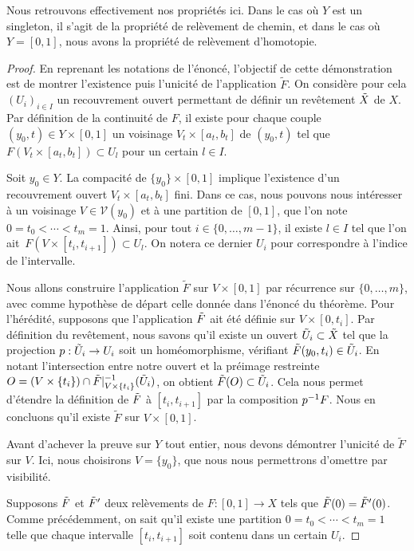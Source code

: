 Nous retrouvons effectivement nos propriétés ici. Dans le cas où $Y$ est un singleton, il s'agit de la propriété de relèvement de chemin, et dans le cas où $Y=[0,1]$, nous avons la propriété de relèvement d'homotopie.

\begin{proof}
En reprenant les notations de l'énoncé, l'objectif de cette démonstration est de montrer l'existence puis l'unicité de l'application $\tilde{F}$. On considère pour cela $(U_i)_{i\in I}$ un recouvrement ouvert permettant de définir un revêtement $\Tilde{X}$ de $X$. Par définition de la continuité de $F$, il existe pour chaque couple~$(y_0,t)\in Y\times[0,1]$ un voisinage $V_t\times[a_t,b_t]$ de $(y_0,t)$ tel que $F(V_t\times[a_t,b_t])\subset U_l$ pour un certain $l\in I$.

Soit $y_0\in Y$. La compacité de $\{y_0\}\times[0,1]$ implique l'existence d'un recouvrement ouvert $V_t\times[a_t,b_t]$ fini. Dans ce cas, nous pouvons nous intéresser à un voisinage $V\in\mathcal{V}(y_0)$ et à une partition de $[0,1]$, que l'on note~$0=t_0<\cdots<t_m=1$. Ainsi, pour tout $i\in\{0,\ldots,m-1\}$, il existe $l\in I$ tel que l'on ait~$F(V\times[t_i,t_{i+1}])\subset U_l$. On notera ce dernier $U_i$ pour correspondre à l'indice de l'intervalle.

\bigskip Nous allons construire l'application $\tilde{F}$ sur $V\times[0,1]$ par récurrence sur $\{0,\ldots,m\}$, avec comme hypothèse de départ celle donnée dans l'énoncé du théorème. Pour l'hérédité, supposons que l'application $\Tilde{F}$ ait été définie sur $V\times[0,t_i]$. Par définition du revêtement, nous savons qu'il existe un ouvert $\Tilde{U}_i\subset\tilde{X}$ tel que la projection $p:\Tilde{U}_i\to U_i$ soit un homéomorphisme, vérifiant $\Tilde{F}(y_0,t_i)\in\Tilde{U}_i$. En notant l'intersection entre notre ouvert et la préimage restreinte $O=(V\times\{t_i\})\cap\Tilde{F}|_{V\times\{t_i\}}^{-1}(\Tilde{U}_i)$, on obtient $\Tilde{F}(O)\subset\Tilde{U}_i$. Cela nous permet d'étendre la définition de $\Tilde{F}$ à $[t_i,t_{i+1}]$ par la composition $p^{-1} F$. Nous en concluons qu'il existe $\tilde{F}$ sur $V\times [0,1]$.

\bigskip Avant d'achever la preuve sur $Y$ tout entier, nous devons démontrer l'unicité de $\tilde{F}$ sur $V$. Ici, nous choisirons $V=\{y_0\}$, que nous nous permettrons d'omettre par visibilité.

Supposons $\Tilde{F}$ et $\Tilde{F}'$ deux relèvements de $F:[0,1]\to X$ tels que $\Tilde{F}(0)=\Tilde{F}'(0)$. Comme précédemment, on sait qu'il existe une partition $0=t_0<\cdots<t_m=1$ telle que chaque intervalle $[t_i,t_{i+1}]$ soit contenu dans un certain $U_i$.


\end{proof}
